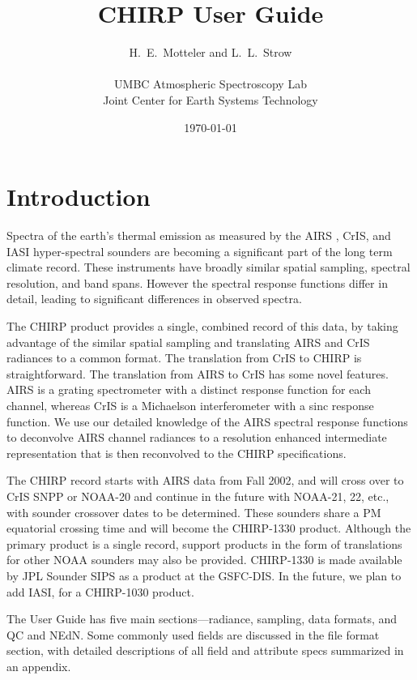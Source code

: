 \documentclass[12pt]{article}
\title{
  CHIRP User Guide \\
}
\author{H.~E.~Motteler and L.~L.~Strow \\
  \\
  UMBC Atmospheric Spectroscopy Lab \\
  Joint Center for Earth Systems Technology \\
}
\date{\today}
\begin{document}
\maketitle


\section{Introduction}

Spectra of the earth's thermal emission as measured by the AIRS
\cite{airs1}, CrIS\cite{cris1,cris2}, and IASI \cite{iasi1}
hyper-spectral sounders are becoming a significant part of the long
term climate record.  These instruments have broadly similar spatial
sampling, spectral resolution, and band spans.  However the spectral
response functions differ in detail, leading to significant
differences in observed spectra.

The CHIRP product provides a single, combined record of this data,
by taking advantage of the similar spatial sampling and translating
AIRS and CrIS radiances to a common format.  The translation from
CrIS to CHIRP is straightforward.  The translation from AIRS to CrIS
has some novel features.  AIRS is a grating spectrometer with a
distinct response function for each channel, whereas CrIS is a
Michaelson interferometer with a sinc response function.  We use our
detailed knowledge of the AIRS spectral response functions to
deconvolve AIRS channel radiances to a resolution enhanced
intermediate representation that is then reconvolved to the CHIRP
specifications.

The CHIRP record starts with AIRS data from Fall 2002, and will
cross over to CrIS SNPP or NOAA-20 and continue in the future with
NOAA-21, 22, etc., with sounder crossover dates to be determined.
These sounders share a PM equatorial crossing time and will become
the CHIRP-1330 product.  Although the primary product is a single
record, support products in the form of translations for other NOAA
sounders may also be provided.  CHIRP-1330 is made available by JPL
Sounder SIPS as a product at the GSFC-DIS.  In the future, we plan
to add IASI, for a CHIRP-1030 product.

The User Guide has five main sections---radiance, sampling, data
formats, and QC and NEdN.  Some commonly used fields are discussed
in the file format section, with detailed descriptions of all field
and attribute specs summarized in an appendix.
\end{document}
